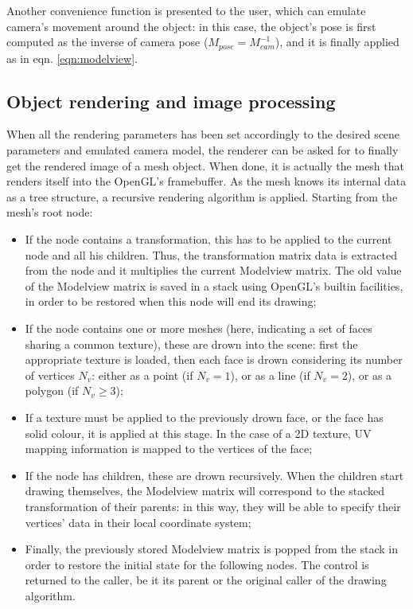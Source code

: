 Another convenience function is presented to the user, which can emulate
camera's movement around the object: in this case, the object's pose is first
computed as the inverse of camera pose ($M_{pose}=M_{cam}^{-1}$), and it is
finally applied as in eqn. \ref{eqn:modelview}.

\subsection{Object rendering and image processing} \label{sec:meshdraw}
When all the rendering parameters has been set accordingly to the desired scene
parameters and emulated camera model, the renderer can be asked for to finally
get the rendered image of a mesh object. When done, it is actually the mesh that
renders itself into the OpenGL's framebuffer. As the mesh knows its internal
data as a tree structure, a recursive rendering algorithm is applied. Starting
from the mesh's root node:

\begin{itemize}
  \item{If the node contains a transformation, this has to be applied to the
      current node and all his children. Thus, the transformation matrix data is
      extracted from the node and it multiplies the current Modelview matrix.
      The old value of the Modelview matrix is saved in a stack using OpenGL's
      builtin facilities, in order to be restored when this node will end its
    drawing;}
  \item{If the node contains one or more meshes (here, indicating a set of
      faces sharing a common texture), these are drown into the scene: first the
      appropriate texture is loaded, then each face is drown considering its
      number of vertices $N_v$: either as a point (if $N_v=1$), or as a line (if
    $N_v=2$), or as a polygon (if $N_v \geq 3$);}
  \item{If a texture must be applied to the previously drown face, or the face
      has solid colour, it is applied at this stage. In the case of a 2D
    texture, UV mapping information is mapped to the vertices of the face;}
  \item{If the node has children, these are drown recursively. When the children
      start drawing themselves, the Modelview matrix will correspond to the
      stacked transformation of their parents: in this way, they will be able to
    specify their vertices' data in their local coordinate system;}
  \item{Finally, the previously stored Modelview matrix is popped from the stack
      in order to restore the initial state for the following nodes. The
      control is returned to the caller, be it its parent or the
    original caller of the drawing algorithm.}
\end{itemize}

